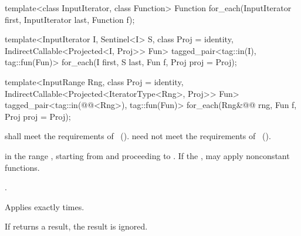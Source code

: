 %
\begin{removedblock}
\begin{itemdecl}
template<class InputIterator, class Function>
  Function for_each(InputIterator first, InputIterator last, Function f);
\end{itemdecl}
\end{removedblock}
\begin{addedblock}
\begin{itemdecl}
template<InputIterator I, Sentinel<I> S, class Proj = identity,
    IndirectCallable<Projected<I, Proj>> Fun>
  tagged_pair<tag::in(I), tag::fun(Fun)>
    for_each(I first, S last, Fun f, Proj proj = Proj{});

template<InputRange Rng, class Proj = identity,
    IndirectCallable<Projected<IteratorType<Rng>, Proj>> Fun>
  tagged_pair<tag::in(@@<Rng>), tag::fun(Fun)>
    for_each(Rng&@\newtxt{\&}@ rng, Fun f, Proj proj = Proj{});
\end{itemdecl}
\end{addedblock}

\begin{itemdescr}
\begin{removedblock}
\pnum
\requires {} shall meet the requirements of
~().
\enternote {} need not meet the requirements of
~().\exitnote
\end{removedblock}

\pnum
\effects
{} in the range
,
starting from
and proceeding to
.
\enternote If the ,  may apply
nonconstant functions.\exitnote

\pnum
\returns
{}.

\pnum
\complexity
Applies 
exactly
times.

\pnum
\notes
If  returns a result, the result is ignored.
\end{itemdescr}

